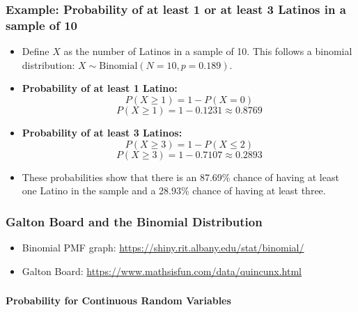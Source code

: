 \documentclass[handout]{beamer} %
\begin{document}
\begin{frame}
\footnotesize
\frametitle{Example: Probability of at least 1 or at least 3 Latinos in a sample of 10}
    \begin{itemize}
        \setlength{\itemsep}{0pt} %
        \item Define \( X \) as the number of Latinos in a sample of 10. This follows a binomial distribution: \( X \sim \text{Binomial}(N=10, p=0.189) \). \pause
        
        \item \textbf{Probability of at least 1 Latino:} \pause
        \[
        P(X \geq 1) = 1 - P(X = 0)
        \]
        \[
        P(X \geq 1) = 1 - 0.1231 \approx 0.8769
        \]
        
        \item \textbf{Probability of at least 3 Latinos:} \pause
        \[
        P(X \geq 3) = 1 - P(X \leq 2)
        \]
        \[
        P(X \geq 3) = 1 - 0.7107 \approx 0.2893
        \]
        
        \item These probabilities show that there is an 87.69\% chance of having at least one Latino in the sample and a 28.93\% chance of having at least three.
    \end{itemize}
\end{frame}


\begin{frame}
\frametitle{Galton Board and the Binomial Distribution}
\begin{itemize}
    \item Binomial PMF graph: \url{https://shiny.rit.albany.edu/stat/binomial/}
    \item Galton Board: \url{https://www.mathsisfun.com/data/quincunx.html}
\end{itemize}
\end{frame}

{
\begin{frame}[noframenumbering]
\frametitle{}
\centering
\vspace*{\fill}
{\color{moonstoneblue!170}\textbf{\Large Probability for Continuous Random Variables}}
\vspace*{\fill}
\end{frame}
}
\end{document}
